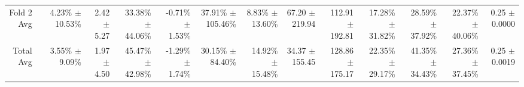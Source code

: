\begin{table}[H]
{\begin{tabular}{rrrrrrrrrrrrrr}
Fold 2 Avg &  & \shortstack{4.23\% \\ $\pm$ 10.53\%} & \shortstack{2.42 \\ $\pm$ 5.27} & \shortstack{33.38\% \\ $\pm$ 44.06\%} & \shortstack{-0.71\% \\ $\pm$ 1.53\%} & \shortstack{37.91\% \\ $\pm$ 105.46\%} & \shortstack{8.83\% \\ $\pm$ 13.60\%} & \shortstack{67.20 \\ $\pm$ 219.94} & \shortstack{112.91 \\ $\pm$ 192.81} & \shortstack{17.28\% \\ $\pm$ 31.82\%} & \shortstack{28.59\% \\ $\pm$ 37.92\%} & \shortstack{22.37\% \\ $\pm$ 40.06\%} & \shortstack{0.25 \\ $\pm$ 0.0000} \\
Total Avg &  & \shortstack{3.55\% \\ $\pm$ 9.09\%} & \shortstack{1.97 \\ $\pm$ 4.50} & \shortstack{45.47\% \\ $\pm$ 42.98\%} & \shortstack{-1.29\% \\ $\pm$ 1.74\%} & \shortstack{30.15\% \\ $\pm$ 84.40\%} & \shortstack{14.92\% \\ $\pm$ 15.48\%} & \shortstack{34.37 \\ $\pm$ 155.45} & \shortstack{128.86 \\ $\pm$ 175.17} & \shortstack{22.35\% \\ $\pm$ 29.17\%} & \shortstack{41.35\% \\ $\pm$ 34.43\%} & \shortstack{27.36\% \\ $\pm$ 37.45\%} & \shortstack{0.25 \\ $\pm$ 0.0019} \\
\bottomrule
\end{tabular}}
\end{table}
